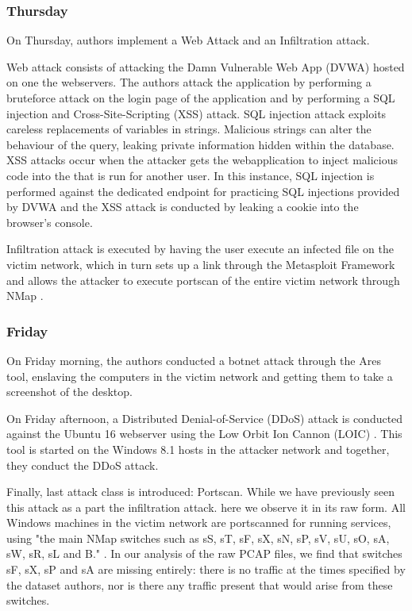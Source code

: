 \subsubsection{Thursday}
On Thursday, authors implement a Web Attack and an Infiltration attack. 

Web attack consists of attacking the Damn Vulnerable Web App (DVWA) hosted on one the webservers. The authors attack the application by performing a bruteforce attack on the login page of the application and by performing a SQL injection and Cross-Site-Scripting (XSS) attack. SQL injection attack exploits careless replacements of variables in strings. Malicious strings can alter the behaviour of the query, leaking private information hidden within the database. XSS attacks occur when the attacker gets the webapplication to inject malicious code into the that is run for another user. In this instance, SQL injection is performed against the dedicated endpoint for practicing SQL injections provided by DVWA and the XSS attack is conducted by leaking a cookie into the browser's console. 

Infiltration attack is executed by having the user execute an infected file on the victim network, which in turn sets up a link through the Metasploit Framework \cite{metasploit} and allows the attacker to execute portscan of the entire victim network through NMap \cite{nmap}.

\subsubsection{Friday}
On Friday morning, the authors conducted a botnet attack through the Ares \cite{ares} tool, enslaving the computers in the victim network and getting them to take a screenshot of the desktop. 

On Friday afternoon, a Distributed Denial-of-Service (DDoS) attack is conducted against the Ubuntu 16 webserver using the Low Orbit Ion Cannon (LOIC) \cite{loic}. This tool is started on the Windows 8.1 hosts in the attacker network and together, they conduct the DDoS attack.

Finally, last attack class is introduced: Portscan. While we have previously seen this attack as a part the infiltration attack. here we observe it in its raw form. All Windows machines in the victim network are portscanned for running services, using "the main NMap switches such as sS, sT, sF, sX, sN, sP, sV, sU, sO, sA, sW, sR, sL and B." \cite{cic_2017}. In our analysis of the raw PCAP files, we find that switches sF, sX, sP and sA are missing entirely: there is no traffic at the times specified by the dataset authors, nor is there any traffic present that would arise from these switches.


